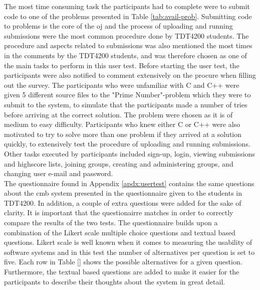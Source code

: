 \clearpage
The most time consuming task the participants had to complete were to submit code to one of the problems presented in Table \ref{tab:avail-prob}. Submitting code to problems is the core of the \gls{oj} and the process of uploading and running submissions were the most common procedure done by TDT4200 students. The procedure and aspects related to submissions was also mentioned the most times in the comments by the TDT4200 students, and was therefore chosen as one of the main tasks to perform in this user test. Before starting the user test, the participants were also notified to comment extensively on the procure when filling out the survey. The participants who were unfamiliar with C and C++ were given 5 different source files to the "Prime Number"-problem which they were to submit to the system, to simulate that the participants made a number of tries before arriving at the correct solution. The problem were chosen as it is of medium to easy difficulty. Participants who knew either C or C++ were also motivated to try to solve more than one problem if they arrived at a solution quickly, to extensively test the procedure of uploading and running submissions. Other tasks executed by participants included sign-up, login, viewing submissions and highscore lists, joining groups, creating and administering groups, and changing user e-mail and password. \\

The questionnaire found in Appendix \ref{apdx:usertest} contains the same questions about the \gls{cmb} system presented in the questionnaire given to the students in TDT4200. In addition, a couple of extra questions were added for the sake of clarity. It is important that the questionairre matches in order to correctly compare the results of the two tests. The questionnaire builds upon a combination of the Likert scale multiple choice questions and textual based questions. Likert scale is well known when it comes to measuring the usability of software systems and in this test the number of alternatives per question is set to five. Each row in Table \ref{} shows the possible alternatives for a given question. Furthermore, the textual based questions are added to make it easier for the participants to describe their thoughts about the system in great detail. \\

